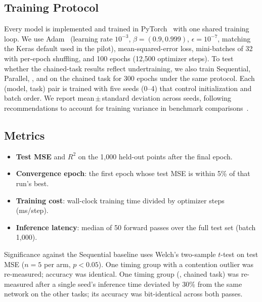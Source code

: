 \subsection{Training Protocol}
Every model is implemented and trained in PyTorch~\cite{paszke2019pytorch} with one shared training loop. We use
Adam~\cite{kingma2015adam} (learning rate $10^{-3}$, $\beta=(0.9,0.999)$, $\epsilon=10^{-7}$, matching the Keras
default used in the pilot), mean-squared-error loss, mini-batches of 32 with per-epoch shuffling, and
100 epochs (12,500 optimizer steps). To test whether the chained-task results reflect undertraining, we also
train Sequential, Parallel, \HA, and \HB on the chained task for 300 epochs under the same protocol. Each (model, task) pair is trained with five seeds (0--4) that control
initialization and batch order. We report mean\,$\pm$\,standard deviation across seeds, following
recommendations to account for training variance in benchmark comparisons~\cite{bouthillier2021accounting}.

\subsection{Metrics}
\begin{itemize}
\item \textbf{Test MSE} and $R^2$ on the 1,000 held-out points after the final epoch.
\item \textbf{Convergence epoch}: the first epoch whose test MSE is within 5\% of that run's best.
\item \textbf{Training cost}: wall-clock training time divided by optimizer steps (ms/step).
\item \textbf{Inference latency}: median of 50 forward passes over the full test set (batch 1{,}000).
\end{itemize}
Significance against the Sequential baseline uses Welch's two-sample $t$-test on test MSE ($n=5$ per arm,
$p<0.05$). \ifcompact
One timing group with a contention outlier was re-measured; accuracy was identical.
\else
One timing group (\HB, chained task) was re-measured after a single seed's inference time deviated by
30\% from the same network on the other tasks; its accuracy was bit-identical across both passes.
\fi

